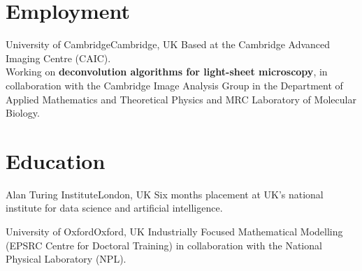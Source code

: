 \documentclass[10pt,a4paper,roman]{moderncv} %
\begin{document}


\section{Employment}

        {University of Cambridge}{Cambridge, UK}{}
        {
          Based at the Cambridge Advanced Imaging Centre (CAIC).\\
          Working on \textbf{deconvolution algorithms for light-sheet microscopy}, in collaboration
          with the Cambridge Image Analysis Group in the Department of Applied Mathematics and Theoretical Physics
          and MRC Laboratory of Molecular Biology.
        }

\section{Education}

        {Alan Turing Institute}{London, UK}{}
        {
          Six months placement at UK's national institute for
          data science and artificial intelligence.
        }

        {University of Oxford}{Oxford, UK}{}
        {
          Industrially Focused Mathematical Modelling 
          (EPSRC Centre for Doctoral Training) 
          in collaboration with the National Physical Laboratory (NPL). 
        }
\end{document}
